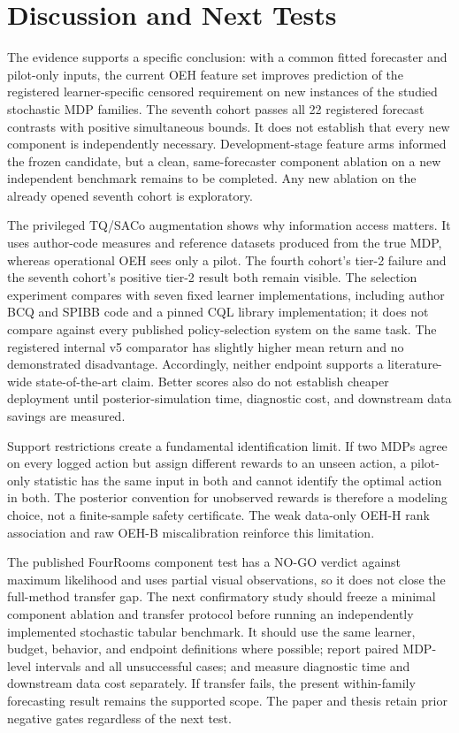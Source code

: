 \section{Discussion and Next Tests}
\label{sec:discussion}
The evidence supports a specific conclusion: with a common fitted forecaster and pilot-only inputs, the current OEH feature set improves prediction of the registered learner-specific censored requirement on new instances of the studied stochastic MDP families. The seventh cohort passes all 22 registered forecast contrasts with positive simultaneous bounds. It does not establish that every new component is independently necessary. Development-stage feature arms informed the frozen candidate, but a clean, same-forecaster component ablation on a new independent benchmark remains to be completed. Any new ablation on the already opened seventh cohort is exploratory.

The privileged TQ/SACo augmentation shows why information access matters. It uses author-code measures and reference datasets produced from the true MDP, whereas operational OEH sees only a pilot. The fourth cohort's tier-2 failure and the seventh cohort's positive tier-2 result both remain visible. The selection experiment compares with seven fixed learner implementations, including author BCQ and SPIBB code and a pinned CQL library implementation; it does not compare against every published policy-selection system on the same task. The registered internal v5 comparator has slightly higher mean return and no demonstrated disadvantage. Accordingly, neither endpoint supports a literature-wide state-of-the-art claim. Better scores also do not establish cheaper deployment until posterior-simulation time, diagnostic cost, and downstream data savings are measured.

Support restrictions create a fundamental identification limit. If two MDPs agree on every logged action but assign different rewards to an unseen action, a pilot-only statistic has the same input in both and cannot identify the optimal action in both. The posterior convention for unobserved rewards is therefore a modeling choice, not a finite-sample safety certificate. The weak data-only OEH-H rank association and raw OEH-B miscalibration reinforce this limitation.

The published FourRooms component test has a NO-GO verdict against maximum likelihood and uses partial visual observations, so it does not close the full-method transfer gap. The next confirmatory study should freeze a minimal component ablation and transfer protocol before running an independently implemented stochastic tabular benchmark. It should use the same learner, budget, behavior, and endpoint definitions where possible; report paired MDP-level intervals and all unsuccessful cases; and measure diagnostic time and downstream data cost separately. If transfer fails, the present within-family forecasting result remains the supported scope. The paper and thesis retain prior negative gates regardless of the next test.
